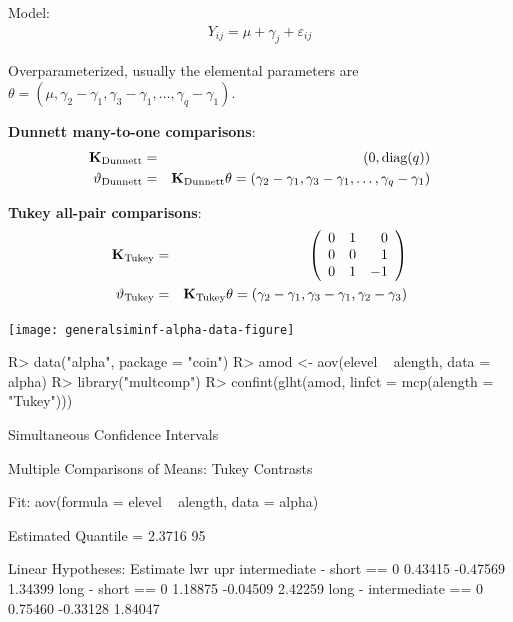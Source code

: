 \documentclass[landscape]{slides}
\begin{document}

Model:
\begin{eqnarray*}
Y_{ij} = \mu + \gamma_{j} + \varepsilon_{ij}
\end{eqnarray*}

Overparameterized, usually the elemental parameters are \\
$\theta = (\mu, \gamma_2 - \gamma_1, \gamma_3 - \gamma_1, \dots, \gamma_q - \gamma_1)$.

\textbf{Dunnett many-to-one comparisons}:
\begin{eqnarray*}
\mathbf{K}_\text{Dunnett} &=& (0, \text{diag}(q)) \\
\vartheta_\text{Dunnett} &=& \mathbf{K}_\text{Dunnett} \theta = (\gamma_2 - \gamma_1, \gamma_3 - \gamma_1,
\dots, \gamma_q - \gamma_1)
\end{eqnarray*}

\textbf{Tukey all-pair comparisons}:
\begin{eqnarray*}
\K_\text{Tukey} &=& \left(
\begin{array}{rrr}
0 & 1 & 0 \\ 
0 & 0 & 1 \\ 
0 & 1 & -1%
\end{array}  
\right) \\
\vartheta_\text{Tukey} &=& \K_\text{Tukey} \theta = (\gamma_2 - \gamma_1, \gamma_3 - \gamma_1,
\gamma_2 - \gamma_3)
\end{eqnarray*}


\begin{center}   
\texttt{[image: generalsiminf-alpha-data-figure]}
\end{center}

\newpage

\begin{Schunk}
\begin{Sinput}
R> data("alpha", package = "coin")   
R> amod <- aov(elevel ~ alength, data = alpha)
R> library("multcomp")
R> confint(glht(amod, linfct = mcp(alength = "Tukey")))
\end{Sinput}
\begin{Soutput}
	 Simultaneous Confidence Intervals

Multiple Comparisons of Means: Tukey Contrasts


Fit: aov(formula = elevel ~ alength, data = alpha)

Estimated Quantile = 2.3716
95%
 

Linear Hypotheses:
                          Estimate lwr      upr     
intermediate - short == 0  0.43415 -0.47569  1.34399
long - short == 0          1.18875 -0.04509  2.42259
long - intermediate == 0   0.75460 -0.33128  1.84047
\end{Soutput}
\end{Schunk}
\end{document}

